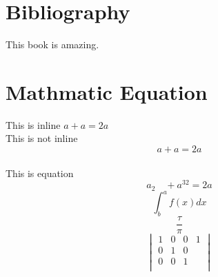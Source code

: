 \documentclass[letter, 12pt]{article}
\begin{document}
\section{Bibliography} %
This book \cite{hochreiter1997long} is amazing.


\section{Mathmatic Equation}
This is inline $a+a=2a$\\
This is not inline $$a+a=2a$$\\
This is equation \begin{equation}
a_2 \quad +a^{32}=2a
\end{equation}
$$ \int^a_b f(x)dx $$
$$\frac{\tau}{\pi}$$
\begin{equation}
\begin{vmatrix}
1 & 0 & 0 & 1\\
0 & 1 & 0\\
0 & 0 & 1\\
\end{vmatrix}
\end{equation}

\end{document}
